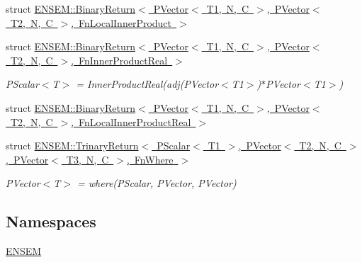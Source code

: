 \begin{DoxyCompactItemize}
struct \mbox{\hyperlink{structENSEM_1_1BinaryReturn_3_01PVector_3_01T1_00_01N_00_01C_01_4_00_01PVector_3_01T2_00_01N_00_61a7f4ae3aaa63ae4a0c9c7a3983d045}{E\+N\+S\+E\+M\+::\+Binary\+Return$<$ P\+Vector$<$ T1, N, C $>$, P\+Vector$<$ T2, N, C $>$, Fn\+Local\+Inner\+Product $>$}}
\item 
struct \mbox{\hyperlink{structENSEM_1_1BinaryReturn_3_01PVector_3_01T1_00_01N_00_01C_01_4_00_01PVector_3_01T2_00_01N_00_468475cad5ee6c317874aa2dbdb6c752}{E\+N\+S\+E\+M\+::\+Binary\+Return$<$ P\+Vector$<$ T1, N, C $>$, P\+Vector$<$ T2, N, C $>$, Fn\+Inner\+Product\+Real $>$}}
\begin{DoxyCompactList}\small\item\em P\+Scalar$<$\+T$>$ = Inner\+Product\+Real(adj(\+P\+Vector$<$\+T1$>$)$\ast$\+P\+Vector$<$\+T1$>$) \end{DoxyCompactList}\item 
struct \mbox{\hyperlink{structENSEM_1_1BinaryReturn_3_01PVector_3_01T1_00_01N_00_01C_01_4_00_01PVector_3_01T2_00_01N_00_ea08dc7f09ce8d8c0ce865f5402be2da}{E\+N\+S\+E\+M\+::\+Binary\+Return$<$ P\+Vector$<$ T1, N, C $>$, P\+Vector$<$ T2, N, C $>$, Fn\+Local\+Inner\+Product\+Real $>$}}
\item 
struct \mbox{\hyperlink{structENSEM_1_1TrinaryReturn_3_01PScalar_3_01T1_01_4_00_01PVector_3_01T2_00_01N_00_01C_01_4_00_0742a5a6fd91ed4d5b98fa11837210028}{E\+N\+S\+E\+M\+::\+Trinary\+Return$<$ P\+Scalar$<$ T1 $>$, P\+Vector$<$ T2, N, C $>$, P\+Vector$<$ T3, N, C $>$, Fn\+Where $>$}}
\begin{DoxyCompactList}\small\item\em P\+Vector$<$\+T$>$ = where(\+P\+Scalar, P\+Vector, P\+Vector) \end{DoxyCompactList}\end{DoxyCompactItemize}
\subsection*{Namespaces}
\begin{DoxyCompactItemize}
\item 
 \mbox{\hyperlink{namespaceENSEM}{E\+N\+S\+EM}}
\end{DoxyCompactItemize}
